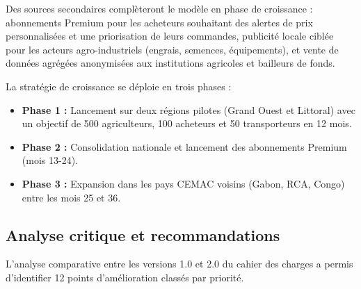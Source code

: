 \documentclass[12pt,a4paper]{report}
\begin{document}
Des sources secondaires complèteront le modèle en phase de croissance : abonnements Premium pour les acheteurs souhaitant des alertes de prix personnalisées et une priorisation de leurs commandes, publicité locale ciblée pour les acteurs agro-industriels (engrais, semences, équipements), et vente de données agrégées anonymisées aux institutions agricoles et bailleurs de fonds.

La stratégie de croissance se déploie en trois phases :
\begin{itemize}
  \item \textbf{Phase 1 :} Lancement sur deux régions pilotes (Grand Ouest et Littoral) avec un objectif de 500 agriculteurs, 100 acheteurs et 50 transporteurs en 12 mois.
  \item \textbf{Phase 2 :} Consolidation nationale et lancement des abonnements Premium (mois 13-24).
  \item \textbf{Phase 3 :} Expansion dans les pays CEMAC voisins (Gabon, RCA, Congo) entre les mois 25 et 36.
\end{itemize}

\subsection{Analyse critique et recommandations}

L'analyse comparative entre les versions 1.0 et 2.0 du cahier des charges a permis d'identifier 12 points d'amélioration classés par priorité.
\end{document}
